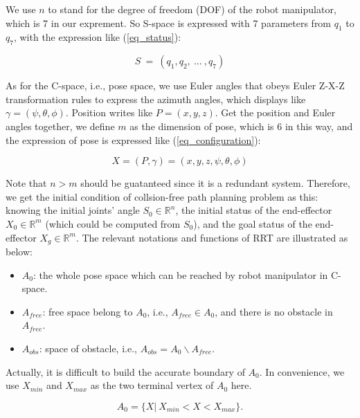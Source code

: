 \documentclass[letterpaper, 10 pt, conference]{ieeeconf}  %
\begin{document}
We use $n$ to stand for the degree of freedom (DOF) of the robot manipulator, which is 7 in our exprement. So S-space is expressed with 7 parameters from $q_1$ to $q_7$, with the expression like (\ref{eq_status}):

\begin{equation}
\label{eq_status}
S \ = \ (q_{1}, q_{2}, \ ...  \ , q_{7})
\end{equation}

As for the C-space, i.e., pose space, we use Euler angles that obeys Euler Z-X-Z transformation rules to express the azimuth angles, which displays like $\gamma = (\psi, \theta, \phi)$. Position writes like $P=(x,y,z)$. Get the position and Euler angles together, we define $m$ as the dimension of pose, which is 6 in this way, and the expression of pose is expressed like (\ref{eq_configuration}):

\begin{equation}
\label{eq_configuration}
X = (P,\gamma) = (x,y,z,\psi,\theta,\phi)
\end{equation}

Note that $n > m$ should be guatanteed since it is a redundant system. Therefore, we get the initial condition of collsion-free path planning problem as this: knowing the initial joints' angle $S_{0}\in \mathbb{R}^n$, the initial status of the end-effector $X_{0}\in \mathbb{R}^m$ (which could be computed from $S_{0}$), and the goal status of the end-effector $X_{g}\in \mathbb{R}^m$. The relevant notations and functions of RRT are illustrated as below:

\begin{itemize}

\item $A_{0}$: the whole pose space which can be reached by robot manipulator in C-space. 

\item $A_{free}$: free space belong to $A_{0}$, i.e., $A_{free} \in A_{0}$, and there is no obstacle in $A_{free}$.

\item $A_{obs}$: space of obstacle, i.e., $A_{obs} = A_{0}  \backslash A_{free}$.

\end{itemize}

Actually, it is difficult to build the accurate boundary of $A_{0}$. In convenience, we use $X_{min}$ and $X_{max}$ as the two terminal vertex of $A_{0}$ here.

\begin{equation}
A_{0} = \{X|\ X_{min} < X < X_{max}\}.
\label{eq_a0}
\end{equation}
\end{document}
